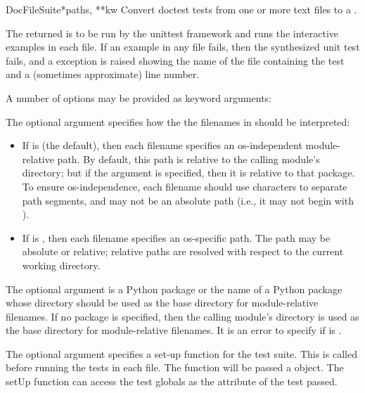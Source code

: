 \begin{funcdesc}{DocFileSuite}{*paths, **kw}
  Convert doctest tests from one or more text files to a
  .

  The returned  is to be run by the unittest
  framework and runs the interactive examples in each file.  If an
  example in any file fails, then the synthesized unit test fails, and
  a  exception is raised showing the
  name of the file containing the test and a (sometimes approximate)
  line number.

  A number of options may be provided as keyword arguments:

  The optional argument  specifies how
  the the filenames in  should be interpreted:

  \begin{itemize}
  \item If  is  (the default), then
        each filename specifies an os-independent module-relative
        path.  By default, this path is relative to the calling
        module's directory; but if the  argument is
        specified, then it is relative to that package.  To ensure
        os-independence, each filename should use \code{/} characters
        to separate path segments, and may not be an absolute path
        (i.e., it may not begin with \code{/}).
  \item If  is , then each filename
        specifies an os-specific path.  The path may be absolute or
        relative; relative paths are resolved with respect to the
        current working directory.
  \end{itemize}

  The optional argument  is a Python package or the name
  of a Python package whose directory should be used as the base
  directory for module-relative filenames.  If no package is
  specified, then the calling module's directory is used as the base
  directory for module-relative filenames.  It is an error to specify
   if  is .

  The optional argument  specifies a set-up function for
  the test suite.  This is called before running the tests in each
  file.  The  function will be passed a 
  object.  The setUp function can access the test globals as the
   attribute of the test passed.


\end{funcdesc}
